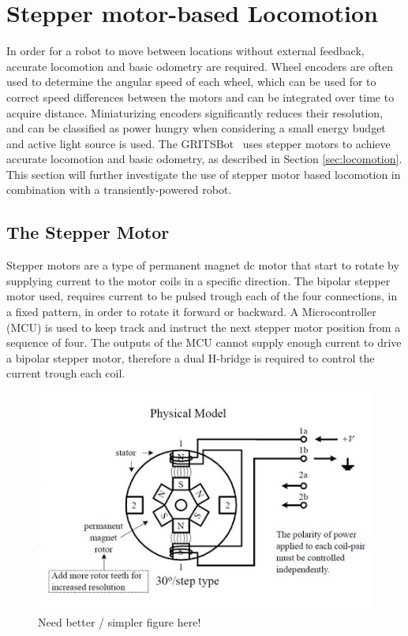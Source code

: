 \section{Stepper motor-based Locomotion}

In order for a robot to move between locations without external feedback, accurate locomotion and basic odometry are required.
Wheel encoders are often used to determine the angular speed of each wheel, which can be used for to correct speed differences between the motors and can be integrated over time to acquire distance.
Miniaturizing encoders significantly reduces their resolution, and can be classified as power hungry when considering a small energy budget and active light source is used.
The GRITSBot~\cite{pickem_icra_2015} uses stepper motors to achieve accurate locomotion and basic odometry, as described in Section \ref{sec:locomotion}.
This section will further investigate the use of stepper motor based locomotion in combination with a transiently-powered robot.

\subsection{The Stepper Motor}
Stepper motors are a type of permanent magnet dc motor that start to rotate by supplying current to the motor coils in a specific direction.
The bipolar stepper motor used, requires current to be pulsed trough each of the four connections, in a fixed pattern, in order to rotate it forward or backward.
A Microcontroller (MCU) is used to keep track and instruct the next stepper motor position from a sequence of four.
The outputs of the MCU cannot supply enough current to drive a bipolar stepper motor, therefore a dual H-bridge is required to control the current trough each coil.

\begin{figure}
	\centering
	\includegraphics[width=\textwidth]{pics/bipolar_stepper.png}
	\caption{Need better / simpler figure here!}
	\label{fig:bipolarstepper}
\end{figure}

